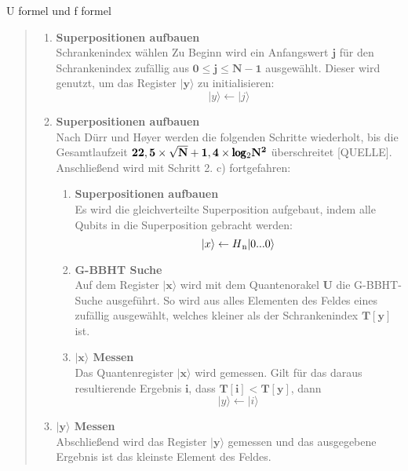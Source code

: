 U formel und f formel
\begin{quote}
    \begin{enumerate}
        \item \textbf{Superpositionen aufbauen}
        \\
        Schrankenindex wählen
        Zu Beginn wird ein Anfangswert $\mathbf{j}$ für den Schrankenindex zufällig aus $\mathbf{0 \leq j \leq N-1}$ ausgewählt. Dieser wird genutzt, um das Register $\mathbf{|y\rangle}$ zu initialisieren: 
        \begin{equation}
            |y\rangle \leftarrow |j\rangle
        \end{equation}
        \item \textbf{Superpositionen aufbauen}
        \\
        Nach Dürr und Høyer werden die folgenden Schritte wiederholt, bis die Gesamtlaufzeit $\mathbf{22,5 \times \sqrt{N} + 1,4 \times \pmb\log\textsubscript{2}N^2}$ überschreitet [QUELLE]. 
        Anschließend wird mit Schritt 2. c) fortgefahren:
        \\
        \begin{enumerate}
            \item \textbf{Superpositionen aufbauen}
            \\
            Es wird die gleichverteilte Superposition aufgebaut, indem alle Qubits in die Superposition gebracht werden:
            \begin{equation}
                |x\rangle \leftarrow H\textsubscript{n}|0 ... 0 \rangle
            \end{equation}
            \item \textbf{G-BBHT Suche}
            \\
            Auf dem Register $\mathbf{|x\rangle}$ wird mit dem Quantenorakel $\mathbf{U}$ die G-BBHT-Suche ausgeführt. 
            So wird aus alles Elementen des Feldes eines zufällig ausgewählt, welches kleiner als der Schrankenindex $\mathbf{T[y]}$ ist.
            \item \textbf{$\mathbf{|x\rangle}$ Messen}
            \\
            Das Quantenregister $\mathbf{|x\rangle}$ wird gemessen. 
            Gilt für das daraus resultierende Ergebnis $\mathbf{i}$, dass $\mathbf{T[i] < T[y]}$, dann 
            \begin{equation}
                |y\rangle \leftarrow |i\rangle
            \end{equation}
        \end{enumerate}

        \item \textbf{$\mathbf{|y\rangle}$ Messen}
        \\
        Abschließend wird das Register $\mathbf{|y\rangle}$ gemessen und das ausgegebene Ergebnis ist das kleinste Element des Feldes.
    \end{enumerate}
\end{quote}

